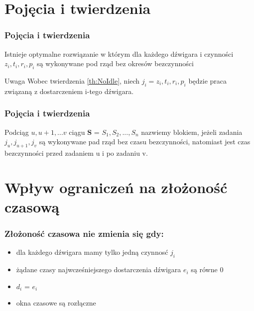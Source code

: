 \documentclass{beamer}
\begin{document}


\section{Pojęcia i twierdzenia}

\begin{frame}

\frametitle{Pojęcia i twierdzenia}
  
 \begin{theorem}\label{th:NoIdle}
  Istnieje optymalne rozwiązanie w którym dla każdego dźwigara i czynności $z_i, t_i, r_i, p_i$ są wykonywane
  pod rząd bez okresów bezczynności
 \end{theorem}
 
 \begin{block}{Uwaga}
  Wobec twierdzenia \ref{th:NoIdle}, niech $j_i = z_i, t_i, r_i, p_i$ będzie praca związaną z dostarczeniem i-tego dźwigara.
 \end{block}

\end{frame}
 



\begin{frame}
\frametitle{Pojęcia i twierdzenia}
  
 \begin{definition}\label{de:block}
  Podciąg $ u, u+1, ... v$ ciągu \textbf{S} = $S_1, S_2,...,S_n $ nazwiemy \alert{blokiem}, jeżeli zadania $j_u, j_{u+1}, j_v $
  są wykonywane pad rząd bez czasu bezczynności, natomiast jest czas bezczynności przed zadaniem u i po zadaniu v.
 \end{definition}
 
 
\end{frame}

\section{Wpływ ograniczeń na złożoność czasową}

\begin{frame}
 \frametitle{ Złożoność czasowa  nie zmienia się gdy:}
 \begin{itemize}
  \item dla każdego dźwigara mamy tylko jedną czynnosć $j_i$
  \item żądane czasy najwcześniejszego dostarczenia dźwigara $ e_i $ są równe 0
  \item $d_i$ = $e_i$
  \item okna czasowe są rozłączne
 \end{itemize}
 

\end{frame}
\end{document}
